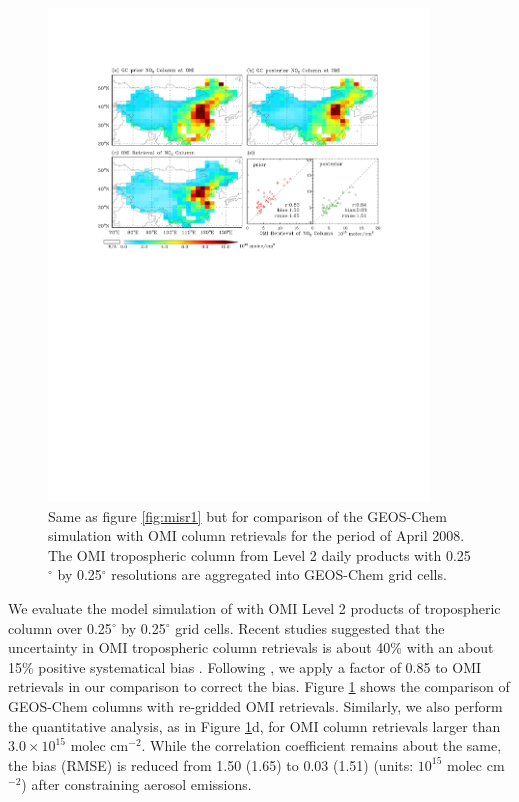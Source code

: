  \begin{figure}[t]
  \centering
  \includegraphics[width={0.9\textwidth}]{figures/a9.pdf}
  \caption[Same as figure \ref{fig:misr1} but for comparison of the
GEOS-Chem  simulation with OMI column  retrievals for
the period of April 2008.]{Same as figure \ref{fig:misr1} but for
comparison of the GEOS-Chem  simulation with OMI column 
retrievals for the period of April 2008.  The OMI tropospheric column
 from Level 2 daily products with 0.25$^{\circ}$ by
0.25$^{\circ}$ resolutions are aggregated into GEOS-Chem grid cells.}
  \label{fig:omno2}
 \end{figure}

 We evaluate the model simulation of  with OMI Level 2 products of
  tropospheric column over 0.25$^{\circ}$ by 0.25$^{\circ}$ grid cells.
 Recent studies suggested that the uncertainty in OMI  tropospheric column retrievals
 is about 40\% with an about 15\% positive systematical bias \citep{Boersma08,Celarier08}.
 Following \citet{Lin10}, we apply a factor of 0.85 to OMI  retrievals
 in our comparison to correct the bias.
 Figure \ref{fig:omno2} shows the comparison of GEOS-Chem  columns
 with re-gridded OMI  retrievals.
 Similarly, we also perform the quantitative analysis, as in Figure \ref{fig:omno2}d,
 for OMI  column retrievals larger than $3.0 \times 10^{15}$ molec cm$^{-2}$.
 While the correlation coefficient remains about the same, the bias (RMSE) is reduced
 from 1.50 (1.65) to 0.03 (1.51) (units: $10^{15}$ molec cm$^{-2}$) after constraining aerosol emissions. 

